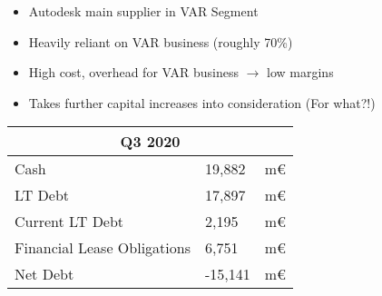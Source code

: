 \documentclass{company_analysis}
\begin{document}
    { %
    \begin{itemize}[leftmargin=*,noitemsep]
        \item Autodesk main supplier in VAR Segment
        \item Heavily reliant on VAR business (roughly \num{70}\%)
        \item High cost, overhead for VAR business $\rightarrow$ low margins
        \item Takes further capital increases into consideration (For what?!)
    \end{itemize}
    }


\newpage
{}

\begin{tabular}{ |p{5cm}||p{3cm}|p{}|  }
    \hline
    \multicolumn{3}{|c|}{\raggedleft Q3 2020} \\
    \hline
    Cash   & 19,882    &m€\\
    \hline
    LT Debt& 17,897  & m€\\
    Current LT Debt & 2,195 & m€\\
    Financial Lease Obligations &6,751 & m€\\
    \hline
    Net Debt & -15,141 &m€\\
    \hline
   \end{tabular}
\end{document}
